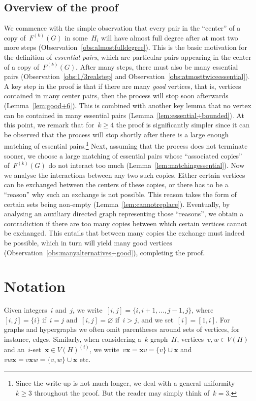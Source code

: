 \documentclass[oneside, 12pt]{amsart}
\numberwithin{equation}{section}
\numberwithin{figure}{section}
\let\emptyset=\varnothing
\theoremstyle{plain}
\theoremstyle{note}
\theoremstyle{remark}
\begin{document}
    \subsection*{Overview of the proof}
    We commence with the simple observation that every pair in the ``center'' of a copy of~$F^{(k)}(G)$ in some~$H_i$ will have almost full degree after at most two more steps (Observation~\ref{obs:almostfulldegree}).
    This is the basic motivation for the definition of \emph{essential pairs}, which are particular pairs appearing in the center of a copy of~$F^{(k)}(G)$.
    After many steps, there must also be many essential pairs (Observation~\ref{obs:1/3realstep} and Observation~\ref{obs:atmosttwiceessential}).
    A key step in the proof is that if there are many \emph{good} vertices, that is, vertices contained in many center pairs, then the process will stop soon afterwards (Lemma~\ref{lem:good+6}).
    This is combined with another key lemma that no vertex can be contained in many essential pairs (Lemma~\ref{lem:essential+bounded}).
    At this point, we remark that for~$k\geq4$ the proof is significantly simpler since it can be observed that the process will stop shortly after there is a large enough matching of essential pairs.\footnote{Since the write-up is not much longer, we deal with a general uniformity~$k\geq3$ throughout the proof. But the reader may simply think of~$k=3$.}
    Next, assuming that the process does not terminate sooner, we choose a large matching of essential pairs whose ``associated copies'' of~$F^{(k)}(G)$ do not interact too much (Lemma~\ref{lem:matchingessential}).
    Now we analyse the interactions between any two such copies.
    Either certain vertices can be exchanged between the centers of these copies, or there has to be a ``reason'' why such an exchange is not possible.
    This reason takes the form of certain sets being non-empty (Lemma~\ref{lem:cannotreplace}).
    Eventually, by analysing an auxiliary directed graph representing those ``reasons'', we obtain a contradiction if there are too many copies between which certain vertices cannot be exchanged.
    This entails that between many copies the exchange must indeed be possible, which in turn will yield many good vertices (Observation~\ref{obs:manyalternatives+good}), completing the proof.

	\section{Notation}\label{sec:notation}
    Given integers~$i$ and~$j$, we write~$[i,j]=\{i,i+1,\dots,j-1,j\}$, where~$[i,j]=\{i\}$ if~$i=j$ and~$[i,j]=\emptyset$ if~$i>j$, and we set~$[i]=[1,i]$.
    For graphs and hypergraphs we often omit parentheses around sets of vertices, for instance, edges.
    Similarly, when considering a~$k$-graph~$H$, vertices~$v,w\in V(H)$ and an~$i$-set~$\mathbf{x}\in V(H)^{(i)}$, we write~$v\mathbf{x}=\mathbf{x}v=\{v\}\cup\mathbf{x}$ and~$vw\mathbf{x}=v\mathbf{x}w=\{v,w\}\cup\mathbf{x}$ etc.
    
\end{document}
